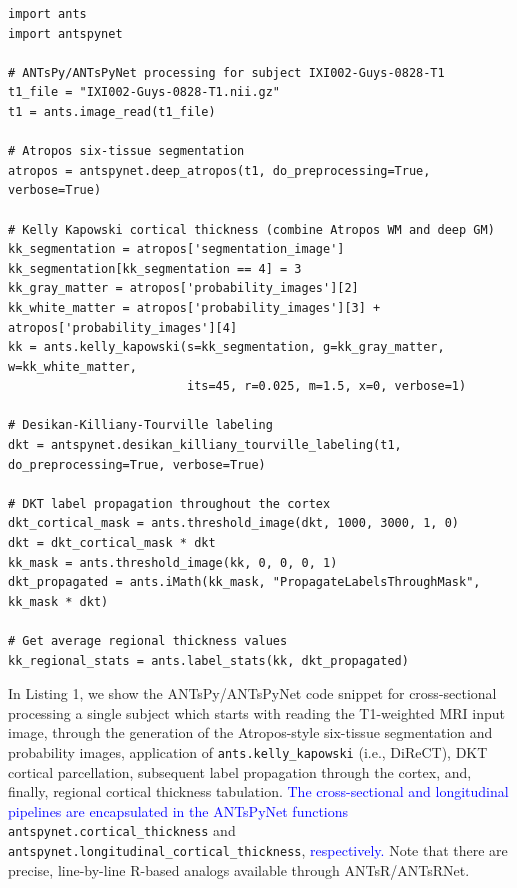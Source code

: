 \documentclass[12pt,]{article}
\begin{document}
\begin{lstlisting}
import ants
import antspynet

# ANTsPy/ANTsPyNet processing for subject IXI002-Guys-0828-T1
t1_file = "IXI002-Guys-0828-T1.nii.gz"
t1 = ants.image_read(t1_file)

# Atropos six-tissue segmentation
atropos = antspynet.deep_atropos(t1, do_preprocessing=True, verbose=True)

# Kelly Kapowski cortical thickness (combine Atropos WM and deep GM)
kk_segmentation = atropos['segmentation_image']
kk_segmentation[kk_segmentation == 4] = 3
kk_gray_matter = atropos['probability_images'][2]
kk_white_matter = atropos['probability_images'][3] + atropos['probability_images'][4]
kk = ants.kelly_kapowski(s=kk_segmentation, g=kk_gray_matter, w=kk_white_matter,
                         its=45, r=0.025, m=1.5, x=0, verbose=1)

# Desikan-Killiany-Tourville labeling
dkt = antspynet.desikan_killiany_tourville_labeling(t1, do_preprocessing=True, verbose=True)

# DKT label propagation throughout the cortex
dkt_cortical_mask = ants.threshold_image(dkt, 1000, 3000, 1, 0)
dkt = dkt_cortical_mask * dkt
kk_mask = ants.threshold_image(kk, 0, 0, 0, 1)
dkt_propagated = ants.iMath(kk_mask, "PropagateLabelsThroughMask", kk_mask * dkt)

# Get average regional thickness values
kk_regional_stats = ants.label_stats(kk, dkt_propagated)
\end{lstlisting}


In Listing 1, we show the ANTsPy/ANTsPyNet code snippet for
cross-sectional processing a single subject which starts with reading
the T1-weighted MRI input image, through the generation of the
Atropos-style six-tissue segmentation and probability images,
application of \texttt{ants.kelly\_kapowski} (i.e., DiReCT), DKT
cortical parcellation, subsequent label propagation through the cortex,
and, finally, regional cortical thickness tabulation.
\textcolor{blue}{The
cross-sectional and longitudinal pipelines are encapsulated in the ANTsPyNet
functions} \texttt{antspynet.cortical\_thickness} and
\texttt{antspynet.longitudinal\_cortical\_thickness},
\textcolor{blue}{respectively.} Note that there are precise,
line-by-line R-based analogs available through ANTsR/ANTsRNet.
\end{document}
